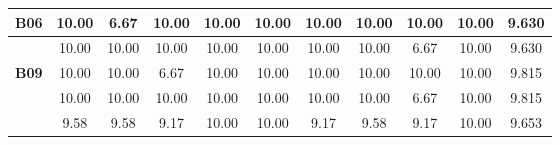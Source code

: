\begin{table}[htbp]
\begin{tabular}{c|cccccccccc|}
		\multicolumn{1}{|c|}{\textbf{B06}} & \multicolumn{1}{c|}{10.00} & \multicolumn{1}{c|}{6.67} & \multicolumn{1}{c|}{10.00} & \multicolumn{1}{c|}{10.00} & \multicolumn{1}{c|}{10.00} & \multicolumn{1}{c|}{10.00} & \multicolumn{1}{c|}{10.00} & \multicolumn{1}{c|}{10.00} & \multicolumn{1}{c|}{10.00} & 9.630 \\ \hline
		\rowcolor[HTML]{F2F2F2} 
		\multicolumn{1}{|c|}{\cellcolor[HTML]{F2F2F2}\textbf{B08}} & \multicolumn{1}{c|}{\cellcolor[HTML]{F2F2F2}10.00} & \multicolumn{1}{c|}{\cellcolor[HTML]{F2F2F2}10.00} & \multicolumn{1}{c|}{\cellcolor[HTML]{F2F2F2}10.00} & \multicolumn{1}{c|}{\cellcolor[HTML]{F2F2F2}10.00} & \multicolumn{1}{c|}{\cellcolor[HTML]{F2F2F2}10.00} & \multicolumn{1}{c|}{\cellcolor[HTML]{F2F2F2}10.00} & \multicolumn{1}{c|}{\cellcolor[HTML]{F2F2F2}10.00} & \multicolumn{1}{c|}{\cellcolor[HTML]{F2F2F2}6.67} & \multicolumn{1}{c|}{\cellcolor[HTML]{F2F2F2}10.00} & 9.630 \\ \hline
		\multicolumn{1}{|c|}{\textbf{B09}} & \multicolumn{1}{c|}{10.00} & \multicolumn{1}{c|}{10.00} & \multicolumn{1}{c|}{6.67} & \multicolumn{1}{c|}{10.00} & \multicolumn{1}{c|}{10.00} & \multicolumn{1}{c|}{10.00} & \multicolumn{1}{c|}{10.00} & \multicolumn{1}{c|}{10.00} & \multicolumn{1}{c|}{10.00} & 9.815 \\ \hline
		\rowcolor[HTML]{F2F2F2} 
		\multicolumn{1}{|c|}{\cellcolor[HTML]{F2F2F2}\textbf{B10}} & \multicolumn{1}{c|}{\cellcolor[HTML]{F2F2F2}10.00} & \multicolumn{1}{c|}{\cellcolor[HTML]{F2F2F2}10.00} & \multicolumn{1}{c|}{\cellcolor[HTML]{F2F2F2}10.00} & \multicolumn{1}{c|}{\cellcolor[HTML]{F2F2F2}10.00} & \multicolumn{1}{c|}{\cellcolor[HTML]{F2F2F2}10.00} & \multicolumn{1}{c|}{\cellcolor[HTML]{F2F2F2}10.00} & \multicolumn{1}{c|}{\cellcolor[HTML]{F2F2F2}10.00} & \multicolumn{1}{c|}{\cellcolor[HTML]{F2F2F2}6.67} & \multicolumn{1}{c|}{\cellcolor[HTML]{F2F2F2}10.00} & 9.815 \\ \hline
		\rowcolor[HTML]{D0CECE} 
		\multicolumn{1}{|c|}{\cellcolor[HTML]{D0CECE}\textbf{Média}} & \multicolumn{1}{c|}{\cellcolor[HTML]{D0CECE}9.58} & \multicolumn{1}{c|}{\cellcolor[HTML]{D0CECE}9.58} & \multicolumn{1}{c|}{\cellcolor[HTML]{D0CECE}9.17} & \multicolumn{1}{c|}{\cellcolor[HTML]{D0CECE}10.00} & \multicolumn{1}{c|}{\cellcolor[HTML]{D0CECE}10.00} & \multicolumn{1}{c|}{\cellcolor[HTML]{D0CECE}9.17} & \multicolumn{1}{c|}{\cellcolor[HTML]{D0CECE}9.58} & \multicolumn{1}{c|}{\cellcolor[HTML]{D0CECE}9.17} & \multicolumn{1}{c|}{\cellcolor[HTML]{D0CECE}10.00} & 9.653 \\ \hline
	\end{tabular}
	\label{tab:F3_A2_NT_CASO_PROPORCIONAL_}
\end{table}

